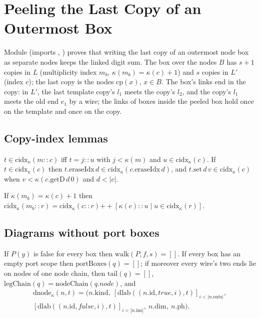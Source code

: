\section{Peeling the Last Copy of an Outermost Box}\label{sec:lean-sym-peel}

Module  (imports , ) proves that writing the last copy of an outermost node box as separate nodes keeps the linked digit sum. The box over the nodes $B$ has $s+1$ copies in $L$ (multiplicity index $m_b$, $\kappa(m_b)=\kappa(c)+1$) and $s$ copies in $L'$ (index $c$); the last copy is the nodes $\mathrm{cp}(x)$, $x\in B$. The box's links end in the copy: in $L'$, the last template copy's $l_1$ meets the copy's $l_2$, and the copy's $l_1$ meets the old end $e_1$ by a wire; the links of boxes inside the peeled box hold once on the template and once on the copy.

\subsection{Copy-index lemmas}

\begin{proposition}
$t\in\mathrm{cidx}_\kappa(m\mathbin{::}c)$ iff $t=j\mathbin{::}u$ with $j<\kappa(m)$ and $u\in\mathrm{cidx}_\kappa(c)$. If $t\in\mathrm{cidx}_\kappa(c)$ then $t.\mathrm{eraseIdx}\,d\in\mathrm{cidx}_\kappa(c.\mathrm{eraseIdx}\,d)$, and $t.\mathrm{set}\,d\,v\in\mathrm{cidx}_\kappa(c)$ when $v<\kappa(c.\mathrm{getD}\,d\,0)$ and $d<|c|$.
\end{proposition}

\begin{proposition}
If $\kappa(m_b)=\kappa(c)+1$ then $\mathrm{cidx}_\kappa(m_b\mathbin{::}r)=\mathrm{cidx}_\kappa(c\mathbin{::}r)\mathbin{+\!\!+}[\kappa(c)\mathbin{::}u\mid u\in\mathrm{cidx}_\kappa(r)]$.
\end{proposition}

\subsection{Diagrams without port boxes}

\begin{proposition}\label{prop:lean-sym-notail}
If $P(y)$ is false for every box then $\mathrm{walk}(P,f,s)=[]$. If every box has an empty port scope then $\mathrm{portBoxes}(q)=[]$; if moreover every wire's two ends lie on nodes of one node chain, then $\mathrm{tail}(q)=[]$, $\mathrm{legChain}(q)=\mathrm{nodeChain}(q.\mathit{node})$, and
\begin{multline*}
\mathrm{dnode}_\kappa(n,t)=\bigl(n.\mathrm{kind},\ [\mathrm{dlab}((n.\mathrm{id},\mathit{true},i),t)]_{i<|n.\mathrm{outs}|},\\ [\mathrm{dlab}((n.\mathrm{id},\mathit{false},i),t)]_{i<|n.\mathrm{ins}|},\ n.\mathrm{dim},\ n.\mathrm{ph}\bigr).
\end{multline*}
\end{proposition}

